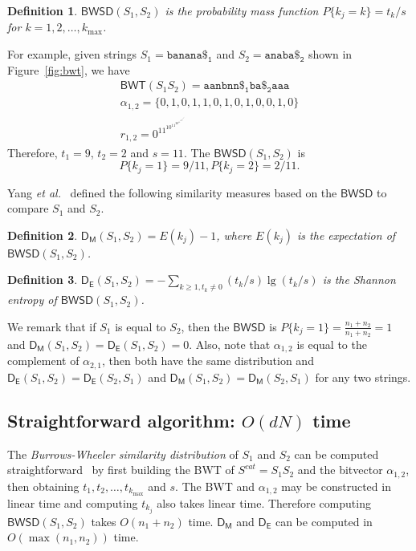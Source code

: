 \documentclass{elsarticle}
\newcommand{\BWT}{\ensuremath{\mathsf{BWT}}\xspace}
\newcommand{\etal}{{\it et al.}\xspace}
\newcommand{\BWSD}{\ensuremath{\mathsf{BWSD}}\xspace}
\newcommand{\B}{\ensuremath{\mathsf{\alpha}}\xspace}
\newcommand{\DM}{\ensuremath{\mathsf{D_M}}\xspace}
\newcommand{\DE}{\ensuremath{\mathsf{D_E}}\xspace}
\newcommand{\Dm}[2]{\ensuremath{\mathsf{D_M}(#1, #2)}\xspace}
\newcommand{\De}[2]{\ensuremath{\mathsf{D_E}(#1, #2)}\xspace}
\newtheorem{definition}{Definition}
\begin{document}
\begin{definition}
$\BWSD(S_1, S_2)$ is the probability mass function $P\{k_j=k\}=t_k/s$ for $k=1,2,\dots, k_{\max}$.
\end{definition}


For example, given strings $S_1= \mathtt{banana\$_1}$ and $S_2= \mathtt{{anaba\$_2}}$
shown in Figure~\ref{fig:bwt}, we have
\[
\begin{array}{c}
\BWT(S_1S_2) = \mathtt{a{a}n{bn}n{\$_1}b{a}{\$_2}a{a}a} \\ 
\B_{1,2}=\{0,1,0,1,1,0,1,0,1,0,0,1,0\} \\ 
r_{1,2} = 0^11^10^11^20^11^10^11^10^21^10^11^0
\end{array}
\]
Therefore, $t_1=9$, $t_2=2$ and $s=11$. The $\BWSD(S_1,S_2)$ is
\[
P\{k_j=1\}=9/11, P\{k_j=2\}=2/11.
\]

Yang \etal~\cite{Yang2010a,Yang2010b} defined the following similarity measures based on the \BWSD
to compare $S_1$ and $S_2$.


\begin{definition}\label{d:expectation}
$\Dm{S_1}{S_2}=E(k_j)-1$, where $E(k_j)$ is the expectation of $\BWSD(S_1,S_2)$.
\end{definition}


\begin{definition}
$\De{S_1}{S_2}=-\sum_{k\geq1, t_k\ne 0}(t_k/s)\lg (t_k/s)$ is the Shannon entropy of $\BWSD(S_1,S_2)$.
\end{definition}


We remark that if $S_1$ is equal to $S_2$, then the \BWSD is
$P\{k_j=1\}=\frac{n_1+n_2}{n_1+n_2}=1$ and $\Dm{S_1}{S_2}=\De{S_1}{S_2}=0$.
Also, note that $\B_{1,2}$ is equal to the complement of $\B_{2,1}$, then both
have the same distribution and $\De{S_1}{S_2}=\De{S_2}{S_1}$ and
$\Dm{S_1}{S_2}=\Dm{S_2}{S_1}$ for any two strings.

\subsection{Straightforward algorithm: $O(dN)$ time}\label{s:yang}

The {\em Burrows-Wheeler similarity distribution} of $S_1$ and $S_2$ 
can be computed straightforward~\cite{Yang2010a,Yang2010b} by first building the BWT of $S^{cat}=S_1S_2$
and the bitvector $\B_{1,2}$, then obtaining $t_1,t_2,\ldots,t_{k_{\max}}$ and
$s$.
The BWT and $\B_{1,2}$ may be constructed in linear time and computing
$t_{k_j}$ also takes linear time.
Therefore computing
$\BWSD(S_1,S_2)$ takes $O(n_1+n_2)$ time. \DM and \DE can be computed in
$O(\max(n_1,n_2))$ time.
\end{document}
